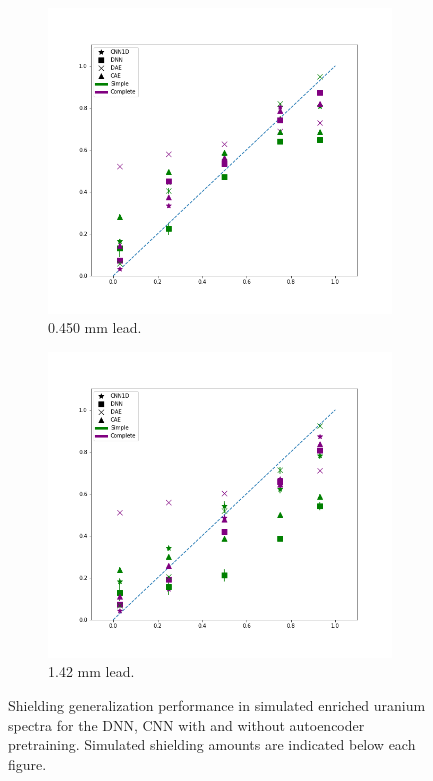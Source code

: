\begin{figure}[H]
     \begin{subfigure}[b]{0.49\textwidth}
         \centering
         \includegraphics[width=\textwidth]{images/simuranium-mediumlead.png}
         \caption{0.450 mm lead.}
         \label{fig:simuranium-mediumlead}
     \end{subfigure}
     \hfill
     \begin{subfigure}[b]{0.49\textwidth}
         \centering
         \includegraphics[width=\textwidth]{images/simuranium-heavylead.png}
         \caption{1.42 mm lead.}
         \label{fig:simuranium-heavylead}
     \end{subfigure}
        \caption{Shielding generalization performance in simulated enriched uranium spectra for the DNN, CNN with and without autoencoder pretraining. Simulated shielding amounts are indicated below each figure.} %
        \label{fig:simuranium-shielding}
\end{figure}


